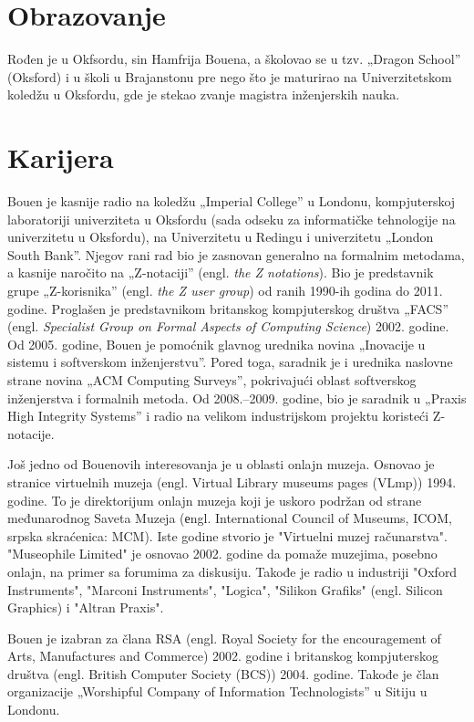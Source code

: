\documentclass[a4paper]{article}
\begin{document}
\section{Obrazovanje}
Rođen je u Okfsordu, sin Hamfrija Bouena\cite{annss}, a školovao se u tzv. „Dragon School” (Oksford) i u školi u Brajanstonu pre nego što je maturirao na Univerzitetskom koledžu u Oksfordu, gde je stekao zvanje magistra inženjerskih nauka. 
\section{Karijera}
Bouen je kasnije radio na koledžu „Imperial College” u Londonu, kompjuterskoj laboratoriji univerziteta u Oksfordu (sada odseku za informatičke tehnologije na univerzitetu u Oksfordu), na Univerzitetu u Redingu i univerzitetu „London South Bank”. Njegov rani rad bio je zasnovan generalno na formalnim metodama, a kasnije naročito na „Z-notaciji” (engl. \textit{the Z notations}). Bio je predstavnik grupe „Z-korisnika” (engl. \textit{the Z user group}) od ranih 1990-ih godina do 2011. godine. Proglašen je predstavnikom britanskog kompjuterskog društva „FACS” (engl. \textit{Specialist Group on Formal Aspects of Computing Science}) 2002. godine\cite{bcs}. Od 2005. godine, Bouen je pomoćnik glavnog urednika novina „Inovacije u sistemu i softverskom inženjerstvu”\cite{editorial}. Pored toga, saradnik je i urednika naslovne strane novina „ACM Computing Surveys”, pokrivajući oblast softverskog inženjerstva i formalnih metoda\cite{editorial2}. Od 2008.–2009. godine, bio je saradnik u „Praxis High Integrity Systems” i radio na velikom industrijskom projektu koristeći Z-notacije.

Još jedno od Bouenovih interesovanja je u oblasti onlajn muzeja. Osnovao je stranice virtuelnih muzeja (engl. Virtual Library museums pages (VLmp)) 1994. godine. To je direktorijum onlajn muzeja koji je uskoro podržan od strane međunarodnog Saveta Muzeja (еngl. International Council of Museums, ICOM, srpska skraćenica: MCM).\cite{vlm} Iste godine stvorio je "Virtuelni muzej računarstva". 
"Museophile Limited"\cite{museophile} je osnovao 2002. godine da pomaže muzejima, posebno onlajn, na primer sa forumima za diskusiju.\cite{jonp} Takođe je radio u industriji "Oxford Instruments", "Marconi Instruments", "Logica", "Silikon Grafiks" (engl. Silicon Graphics) i "Altran Praxis".

Bouen je izabran za člana RSA (engl. Royal Society for the encouragement of Arts, Manufactures and Commerce) 2002. godine i britanskog kompjuterskog društva (engl. British Computer Society (BCS)) 2004. godine. Takođe je član organizacije „Worshipful Company of Information Technologists” u Sitiju u Londonu.
\end{document}
